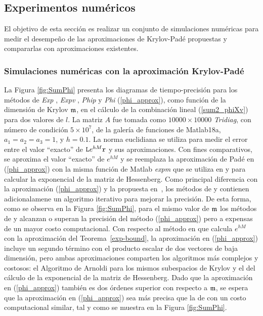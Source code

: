 \subsection{Experimentos numéricos}\label{section:num-sim-kp}
El objetivo de esta sección es realizar un conjunto de simulaciones numéricas para medir el desempeño de las aproximaciones de Krylov-Padé propuestas y compararlas con aproximaciones existentes.


\subsubsection{Simulaciones numéricas con la aproximación Krylov-Padé}
La Figura \ref{fig:SumPhi} presenta los diagramas de tiempo-precisión para los métodos de \textit{Exp} \cite{hochbruck1997krylov}, \textit{Expv} \cite{sidje1998expokit}, \textit{Phip} \cite{niesen2012algorithm} y \textit{Phi} (\ref{phi_approx}), como función de la dimensión de Krylov $\mathfrak{m}$, en el cálculo de la combinación lineal (\ref{sum2_phiXv}) para dos valores de $l$. La matriz $A$ fue tomada como $10000 \times 10000$ \textit{Tridiag}, con número de condición $5\times 10^{7}$, de la galería de funciones de Matlab18a, $a_1=a_2=a_3=1$, y $h=0$.$1$. La norma euclidiana se utiliza para medir el error entre el valor ``exacto'' de $\mathtt{L} e^{h M}\mathtt{r}$ y sus aproximaciones. Con fines comparativos, se aproxima el valor ``exacto'' de $e^{h M}$ y se reemplaza la aproximación de Padé en (\ref{phi_approx}) con la misma función de Matlab \textit{expm} que se utiliza en \cite{sidje1998expokit} y \cite{niesen2012algorithm} para calcular la exponencial de la matriz de Hessenberg. Como principal diferencia con la aproximación (\ref{phi_approx}) y la propuesta en~\cite{hochbruck1997krylov}, los métodos de \cite{sidje1998expokit} y \cite{niesen2012algorithm} contienen adicionalamene un algoritmo iterativo para mejorar la precisión. De esta forma, como se observa en la Figura \ref{fig:SumPhi}, para el mismo valor de $\mathfrak{m}$ los métodos de \cite{sidje1998expokit} y \cite{niesen2012algorithm} alcanzan o superan la precisión del método (\ref{phi_approx}) pero a expensas de un mayor costo computacional. Con respecto al método en \cite{hochbruck1997krylov} que calcula $e^{h M}$ con la aproximación del Teorema~\ref{exp-bound}, la aproximación en (\ref{phi_approx}) incluye un segundo término con el producto escalar de dos vectores de baja dimensión, pero ambas aproximaciones comparten los  algoritmos más complejos y costosos: el Algoritmo de Arnoldi para los mismos subespacios de Krylov y el del cálculo de la exponencial de la  matriz de Hessenberg. Dado que la aproximación en (\ref{phi_approx}) también es dos órdenes superior con respecto a $\mathfrak{m}$, se espera que la aproximación en (\ref{phi_approx}) sea más precisa que la de \cite{hochbruck1997krylov} con un costo computacional similar, tal y como se muestra en la Figura \ref{fig:SumPhi}.

